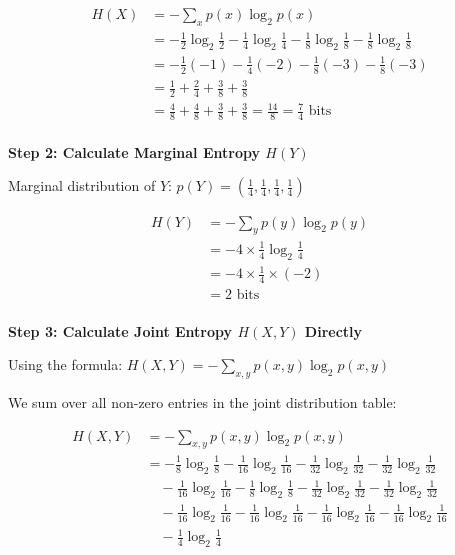 \documentclass[11pt,a4paper]{book}
\newcounter{qna}[chapter]
\renewcommand{\theqna}{\thechapter.\arabic{qna}}
\newenvironment{questionanswerbox}{
    \refstepcounter{qna}%
    \begin{tcolorbox}[
        enhanced,
        breakable,
        colback=softlavender!10,
        colframe=softlavender!200,
        title={Example~\theqna}, %
        fonttitle=\bfseries,
        coltitle=white,
        colbacktitle=softlavender!200,
        sharp corners,
        boxrule=1pt,
        left=8pt,
        right=8pt,
        top=6pt,
        bottom=6pt
    ]
}{
    \end{tcolorbox}
}
\begin{document}
\begin{questionanswerbox}
    \begin{align*}
        H(X) & = -\sum_{x} p(x) \log_2 p(x)                                                                                                     \\
             & = -\frac{1}{2}\log_2 \frac{1}{2} - \frac{1}{4}\log_2 \frac{1}{4} - \frac{1}{8}\log_2 \frac{1}{8} - \frac{1}{8}\log_2 \frac{1}{8} \\
             & = -\frac{1}{2}(-1) - \frac{1}{4}(-2) - \frac{1}{8}(-3) - \frac{1}{8}(-3)                                                         \\
             & = \frac{1}{2} + \frac{2}{4} + \frac{3}{8} + \frac{3}{8}                                                                          \\
             & = \frac{4}{8} + \frac{4}{8} + \frac{3}{8} + \frac{3}{8} = \frac{14}{8} = \frac{7}{4} \text{ bits}
    \end{align*}
    \\
    \textbf{Step 2: Calculate Marginal Entropy \(H(Y)\)}

    Marginal distribution of \(Y\): \(p(Y) = \left(\frac{1}{4}, \frac{1}{4}, \frac{1}{4}, \frac{1}{4}\right)\)

    \begin{align*}
        H(Y) & = -\sum_{y} p(y) \log_2 p(y)              \\
             & = -4 \times \frac{1}{4}\log_2 \frac{1}{4} \\
             & = -4 \times \frac{1}{4} \times (-2)       \\
             & = 2 \text{ bits}
    \end{align*}
    \\
    \textbf{Step 3: Calculate Joint Entropy \(H(X,Y)\) Directly}

    Using the formula: \(H(X,Y) = -\sum_{x,y} p(x,y) \log_2 p(x,y)\)

    We sum over all non-zero entries in the joint distribution table:

    \begin{align*}
        H(X,Y) & = -\sum_{x,y} p(x,y) \log_2 p(x,y)                                                                                                        \\
               & = -\frac{1}{8}\log_2\frac{1}{8} - \frac{1}{16}\log_2\frac{1}{16} - \frac{1}{32}\log_2\frac{1}{32} - \frac{1}{32}\log_2\frac{1}{32}        \\
               & \quad - \frac{1}{16}\log_2\frac{1}{16} - \frac{1}{8}\log_2\frac{1}{8} - \frac{1}{32}\log_2\frac{1}{32} - \frac{1}{32}\log_2\frac{1}{32}   \\
               & \quad - \frac{1}{16}\log_2\frac{1}{16} - \frac{1}{16}\log_2\frac{1}{16} - \frac{1}{16}\log_2\frac{1}{16} - \frac{1}{16}\log_2\frac{1}{16} \\
               & \quad - \frac{1}{4}\log_2\frac{1}{4}
    \end{align*}


\end{questionanswerbox}
\end{document}
